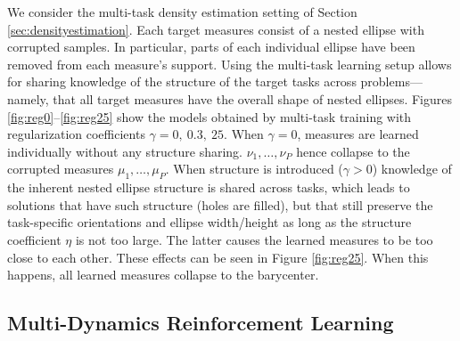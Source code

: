 \documentclass{article}
\begin{document}
We consider the multi-task density estimation setting of Section \ref{sec:densityestimation}. Each target measures consist of a nested ellipse with corrupted samples. In particular, parts of each individual ellipse have been removed from each measure's support. Using the multi-task learning setup allows for sharing knowledge of the structure of the target tasks across problems---namely, that all target measures have the overall shape of nested ellipses. 
%
Figures \ref{fig:reg0}--\ref{fig:reg25} show the models obtained by multi-task training with regularization coefficients $\gamma = 0,\ 0.3,\ 25$. When $\gamma=0$, measures are learned individually without any structure sharing.  $\nu_1,\ldots, \nu_P$ hence collapse to the corrupted measures $\mu_1, \ldots ,\mu_P$. When structure is introduced ($\gamma>0$) knowledge of the inherent nested ellipse structure is shared across tasks, which leads to solutions that have such structure (holes are filled), but that still preserve the task-specific orientations and ellipse width/height as long as the structure coefficient $\eta$ is not too large. The latter causes the learned measures to be too close to each other. These effects can be seen in Figure \ref{fig:reg25}. When this happens, all learned measures collapse to the barycenter.




\subsection{Multi-Dynamics Reinforcement Learning}
\end{document}

